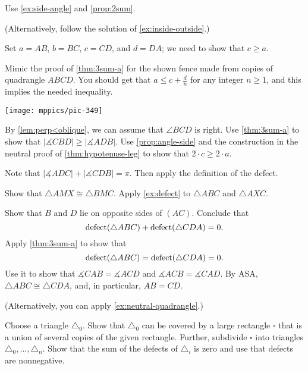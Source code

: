 

Use \ref{ex:side-angle} and \ref{prop:2sum}.

(Alternatively, follow the solution of \ref{ex:inside-outside}.)

Set $a=AB$, $b=BC$, $c=CD$, and $d=DA$; we need to show that $c\ge a$.

Mimic the proof of \ref{thm:3sum-a} for the shown fence made from copies of quadrangle $ABCD$.
You should get that $a\le c+\tfrac dn$ for any integer $n\ge 1$, and this implies the needed inequality.

\begin{Figure}
\vskip-0mm
\centering
\texttt{[image: mppics/pic-349]}
\end{Figure}

By \ref{lem:perp<oblique}, we can assume that $\angle BCD$ is right.
Use \ref{thm:3sum-a} to show that $|\measuredangle CBD|\ge|\measuredangle ADB|$.
Use \ref{prop:angle-side} and the construction in the neutral proof of \ref{thm:hypotenuse-leg} to show that $2\cdot c\ge 2\cdot a$.

Note that 
$|\measuredangle ADC|+|\measuredangle CDB|=\pi$.
Then apply the definition of the defect.

Show that $\triangle AMX\cong \triangle BMC$. 
Apply \ref{ex:defect} to $\triangle ABC$ and $\triangle AXC$.


Show that $B$ and $D$ lie on opposite sides of $(AC)$.
Conclude that 
\[\mathop{\rm defect}\nolimits(\triangle ABC)+\mathop{\rm defect}\nolimits(\triangle CDA)=0.\]
Apply \ref{thm:3sum-a} to show that 
\[\mathop{\rm defect}\nolimits(\triangle ABC)=\mathop{\rm defect}\nolimits(\triangle CDA)=0.\]
Use it to show that $\measuredangle CAB=\measuredangle ACD$ and $\measuredangle ACB=\measuredangle CAD$.
By ASA, $\triangle ABC\cong\triangle CDA$, and, in particular, $AB=CD$.

(Alternatively, you can apply \ref{ex:neutral-quadrangle}.)

Choose a triangle $\triangle_0$.
Show that $\triangle_0$ can be covered by a large rectangle $\square$ that is a union of several copies of the given rectangle.
Further, subdivide $\square$ into triangles $\triangle_0,\dots, \triangle_n$.
Show that the sum of the defects of $\triangle_i$ is zero and use that defects are nonnegative.

